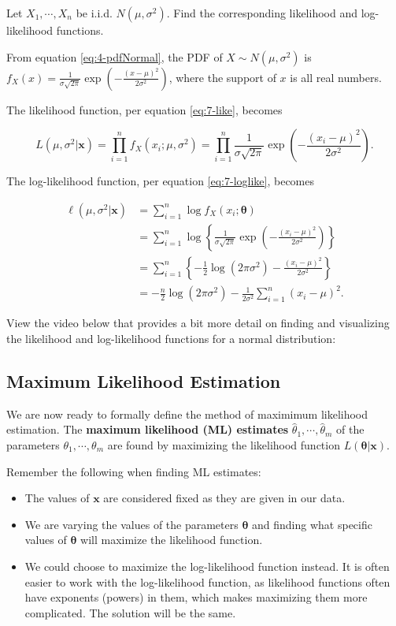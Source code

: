 \documentclass[
]{book}
\providecommand{\tightlist}{%
  \setlength{\itemsep}{0pt}\setlength{\parskip}{0pt}}
\begin{document}
Let \(X_1, \cdots, X_n\) be i.i.d. \(N(\mu, \sigma^2)\). Find the corresponding likelihood and log-likelihood functions.

From equation \eqref{eq:4-pdfNormal}, the PDF of \(X \sim N(\mu, \sigma^2)\) is \(f_X(x) =  \frac{1}{\sigma \sqrt{2 \pi}} \exp \left(-\frac{(x - \mu)^2}{2 \sigma^2} \right)\), where the support of \(x\) is all real numbers.

The likelihood function, per equation \eqref{eq:7-like}, becomes

\[
L(\mu, \sigma^2 | \boldsymbol{x} ) = \prod_{i=1}^n f_X(x_i; \mu, \sigma^2) = \prod_{i=1}^n \frac{1}{\sigma \sqrt{2 \pi}} \exp \left(-\frac{(x_i - \mu)^2}{2 \sigma^2} \right).
\]

The log-likelihood function, per equation \eqref{eq:7-loglike}, becomes

\[
\begin{split}
\ell (\mu, \sigma^2 | \boldsymbol{x}) &= \sum_{i=1}^n \log f_X(x_i; \boldsymbol{\theta}) \\
                          &= \sum_{i=1}^n \log \left\{ \frac{1}{\sigma \sqrt{2 \pi}} \exp \left(-\frac{(x_i - \mu)^2}{2 \sigma^2} \right) \right\} \\
                          &= \sum_{i=1}^n \left\{-\frac{1}{2} \log (2 \pi \sigma^2) -\frac{(x_i - \mu)^2}{2 \sigma^2} \right\} \\
                          &= -\frac{n}{2} \log (2 \pi \sigma^2) - \frac{1}{2 \sigma^2} \sum_{i=1}^n (x_i - \mu)^2.
\end{split}
\]

View the video below that provides a bit more detail on finding and visualizing the likelihood and log-likelihood functions for a normal distribution:

\subsection{Maximum Likelihood Estimation}\label{maximum-likelihood-estimation}

We are now ready to formally define the method of maximimum likelihood estimation. The \textbf{maximum likelihood (ML) estimates} \(\hat{\theta}_1, \cdots, \hat{\theta}_m\) of the parameters \(\theta_1, \cdots, \theta_m\) are found by maximizing the likelihood function \(L(\boldsymbol{\theta} | \boldsymbol{x} )\).

Remember the following when finding ML estimates:

\begin{itemize}
\tightlist
\item
  The values of \(\boldsymbol{x}\) are considered fixed as they are given in our data.
\item
  We are varying the values of the parameters \(\boldsymbol{\theta}\) and finding what specific values of \(\boldsymbol{\theta}\) will maximize the likelihood function.
\item
  We could choose to maximize the log-likelihood function instead. It is often easier to work with the log-likelihood function, as likelihood functions often have exponents (powers) in them, which makes maximizing them more complicated. The solution will be the same.
\end{itemize}
\end{document}
